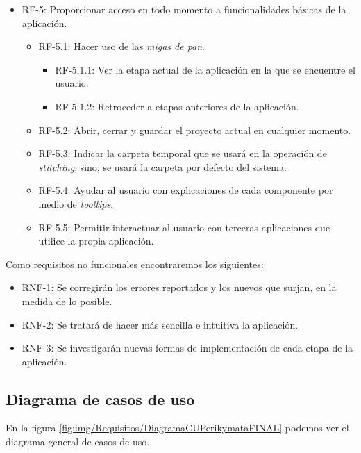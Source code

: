 \begin{itemize}
        \item RF-5: Proporcionar acceso en todo momento a funcionalidades básicas de la aplicación.
            \begin{itemize}
                \item RF-5.1: Hacer uso de las \textit{migas de pan}.
                \begin{itemize}
                        \item RF-5.1.1: Ver la etapa actual de la aplicación en la que se encuentre el usuario.
                        \item RF-5.1.2: Retroceder a etapas anteriores de la aplicación.
                \end{itemize}
                \item RF-5.2: Abrir, cerrar y guardar el proyecto actual en cualquier momento.
                \item RF-5.3: Indicar la carpeta temporal que se usará en la operación de \textit{stitching}, sino, se usará la carpeta por defecto del sistema. 
                \item RF-5.4: Ayudar al usuario con explicaciones de cada componente por medio de \textit{tooltips}.
                \item RF-5.5: Permitir interactuar al usuario con terceras aplicaciones que utilice la propia aplicación.
            \end{itemize}
    
\end{itemize}    
    \pagebreak
    Como requisitos no funcionales encontraremos los siguientes:
    \begin{itemize}
            \item RNF-1: Se corregirán los errores reportados y los nuevos que surjan, en la medida de lo posible. 
            \item RNF-2: Se tratará de hacer más sencilla e intuitiva la aplicación.
            \item RNF-3: Se investigarán nuevas formas de implementación de cada etapa de la aplicación.
    \end{itemize}

\subsection{Diagrama de casos de uso}

En la figura \ref{fig:img/Requisitos/DiagramaCUPerikymataFINAL} podemos ver el diagrama general de casos de uso.

